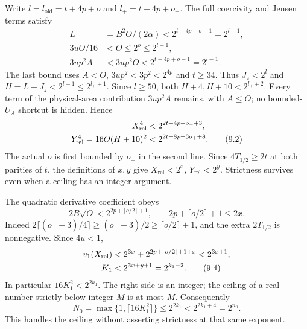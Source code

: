 \documentclass[11pt]{article}
\theoremstyle{plain}
\theoremstyle{definition}
\theoremstyle{remark}
\begin{document}
Write $l=l_{\mathrm{old}}=t+4p+o$ and $l_+=t+4p+o_+$.
The full coercivity and Jensen terms satisfy
\begin{align*}
 L&=B^2O/(2\alpha)<2^{t+4p+o-1}=2^{l-1},\\
 3uO/16&<O\le2^o\le2^{l-1},\\
 3up^2A&<3up^2O<2^{t+4p+o-1}=2^{l-1}.
\end{align*}
The last bound uses $A<O$, $3up^2<3p^2<2^{4p}$ and $t\ge34$.
Thus $J_z<2^l$ and $H=L+J_z<2^{l+1}\le2^{l_++1}$.
Since $l\ge50$, both $H+4,H+10<2^{l_++2}$.
Every term of the physical-area contribution $3up^2A$ remains, with
$A\le O$; no bounded-$U_A$ shortcut is hidden. Hence
\begin{align}
 X_{\mathrm{rel}}^4&<2^{2t+4p+o_++3},\notag\\
 Y_{\mathrm{rel}}^4=16O(H+10)^2&<2^{2t+8p+3o_++8}.\tag{9.2}
\end{align}
The actual $o$ is first bounded by $o_+$ in the second line.
Since $4T_{1/2}\ge2t$ at both parities of $t$, the definitions of $x,y$
give $X_{\mathrm{rel}}<2^x$, $Y_{\mathrm{rel}}<2^y$.
Strictness survives even when a ceiling has an integer argument.

The quadratic derivative coefficient obeys
\begin{equation}
 2B\sqrt O<2^{2p+\lceil o/2\rceil+1},\qquad
 2p+\lceil o/2\rceil+1\le2x.\tag{9.3}
\end{equation}
Indeed $2\lceil(o_++3)/4\rceil\ge(o_++3)/2\ge\lceil o/2\rceil+1$,
and the extra $2T_{1/2}$ is nonnegative. Since $4u<1$,
\begin{align}
 v_1(X_{\mathrm{rel}})&<2^{3x}+2^{2p+\lceil o/2\rceil+1+x}
                         <2^{3x+1},\notag\\
 K_1&<2^{3x+y+1}=2^{k_1-2}.\tag{9.4}
\end{align}
In particular $16K_1^2<2^{2k_1}$. The right side is an integer;
the ceiling of a real number strictly below integer $M$ is at most $M$.
Consequently
\begin{equation}
 N_0=\max\{1,\lceil16K_1^2\rceil\}\le2^{2k_1}
       <2^{2k_1+4}=2^{n_0}.\tag{9.5}
\end{equation}
This handles the ceiling without asserting strictness at that same exponent.
\end{document}
